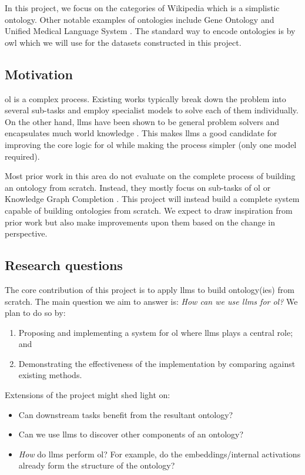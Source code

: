 In this project, we focus on the categories of Wikipedia which is a simplistic ontology. Other notable examples of ontologies include Gene Ontology \citep{gene-ontology} and Unified Medical Language System \citep{umls}. The standard way to encode ontologies is by \gls{owl} which we will use for the datasets constructed in this project.

\subsection*{Motivation}

\gls{ol} is a complex process. Existing works typically break down the problem into several sub-tasks and employ specialist models to solve each of them individually. On the other hand, \gls{llm}s have been shown to be general problem solvers \citep{gpt3} and encapsulates much world knowledge \citep{llm-knowledge-base}. This makes \gls{llm}s a good candidate for improving the core logic for \gls{ol} while making the process simpler (only one model required).

Most prior work in this area do not evaluate on the complete process of building an ontology from scratch. Instead, they mostly focus on sub-tasks of \gls{ol} or Knowledge Graph Completion \citep{llms4ol,yao2023exploring,cabot2021rebel}. This project will instead build a complete system capable of building ontologies from scratch. We expect to draw inspiration from prior work but also make improvements upon them based on the change in perspective.

\subsection*{Research questions}

The core contribution of this project is to apply \gls{llm}s to build ontology(ies) from scratch. The main question we aim to answer is: \emph{How can we use \gls{llm}s for \gls{ol}?} We plan to do so by:
\begin{enumerate}
    \item Proposing and implementing a system for \gls{ol} where \gls{llm}s plays a central role; and
    \item Demonstrating the effectiveness of the implementation by comparing against existing methods.
\end{enumerate}

Extensions of the project might shed light on:
\begin{itemize}
    \item Can downstream tasks benefit from the resultant ontology?
    \item Can we use \gls{llm}s to discover other components of an ontology?
    \item \emph{How} do \gls{llm}s perform \gls{ol}? For example, do the embeddings/internal activations already form the structure of the ontology?
\end{itemize}

